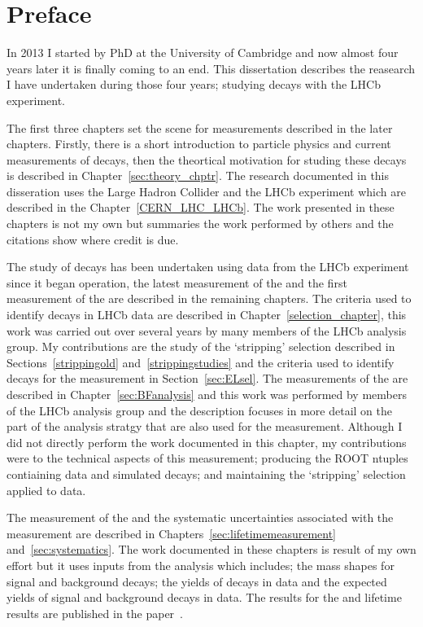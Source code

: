 \chapter{Preface}

In 2013 I started by PhD at the University of Cambridge and now almost four years later it is finally coming to an end. This dissertation describes the reasearch I have undertaken during those four years; studying \bmumu decays with the LHCb experiment. 

The first three chapters set the scene for measurements described in the later chapters. Firstly, there is a short introduction to particle physics and current measurements of \bmumu decays, then the theortical motivation for studing these decays is described in Chapter~\ref{sec:theory_chptr}. The research documented in this disseration uses the Large Hadron Collider and the LHCb experiment which are described in the Chapter~\ref{CERN_LHC_LHCb}. The work presented in these chapters is not my own but summaries the work performed by others and the citations show where credit is due.

The study of \bmumu decays has been undertaken using data from the LHCb experiment since it began operation, the latest measurement of the \bmumu \BFs and the first measurement of the \bsmumu \el are described in the remaining chapters.
The criteria used to identify \bmumu decays in LHCb data are described in Chapter~\ref{selection_chapter}, this work was carried out over several years by many members of the \bmumu LHCb analysis group. My contributions are the study of the `stripping' selection described in Sections~\ref{strippingold} and~\ref{strippingstudies} and the criteria used to identify \bsmumu decays for the \el measurement in Section~\ref{sec:ELsel}.
The measurements of the \bmumu \BFs are described in Chapter~\ref{sec:BFanalysis} and this work was performed by members of the \bmumu LHCb analysis group and the description focuses in more detail on the part of the analysis stratgy that are also used for the \el measurement. Although I did not directly perform the work documented in this chapter, my contributions were to the technical aspects of this measurement; producing the ROOT ntuples contiaining data and simulated decays; and maintaining the `stripping' selection applied to data. 

The measurement of the \bsmumu \el and the systematic uncertainties associated with the measurement are described in Chapters~\ref{sec:lifetimemeasurement} and~\ref{sec:systematics}. 
The work documented in these chapters is result of my own effort but it uses inputs from the \BF analysis which includes; the mass shapes for signal and background decays; the yields of \bsjpsiphi decays in data and the expected yields of signal and background decays in data. The results for the \bmumu \BF and \bsmumu \el lifetime results are published in the paper~\cite{Aaij:2017vad}.

